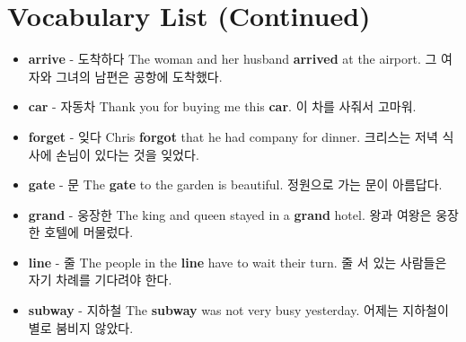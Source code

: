 \documentclass{article}
\begin{document}
\section*{Vocabulary List (Continued)}
\begin{addmargin}[1em]{1em}
    \begin{itemize}
        \item \fontsize{12pt}{14pt}\selectfont \textbf{arrive} - 도착하다 \newline
        The woman and her husband \textbf{arrived} at the airport. \newline
        그 여자와 그녀의 남편은 공항에 도착했다.

        \item \fontsize{12pt}{14pt}\selectfont \textbf{car} - 자동차 \newline
        Thank you for buying me this \textbf{car}. \newline
        이 차를 사줘서 고마워.

        \item \fontsize{12pt}{14pt}\selectfont \textbf{forget} - 잊다 \newline
        Chris \textbf{forgot} that he had company for dinner. \newline
        크리스는 저녁 식사에 손님이 있다는 것을 잊었다.

        \item \fontsize{12pt}{14pt}\selectfont \textbf{gate} - 문 \newline
        The \textbf{gate} to the garden is beautiful. \newline
        정원으로 가는 문이 아름답다.

        \item \fontsize{12pt}{14pt}\selectfont \textbf{grand} - 웅장한 \newline
        The king and queen stayed in a \textbf{grand} hotel. \newline
        왕과 여왕은 웅장한 호텔에 머물렀다.

        \item \fontsize{12pt}{14pt}\selectfont \textbf{line} - 줄 \newline
        The people in the \textbf{line} have to wait their turn. \newline
        줄 서 있는 사람들은 자기 차례를 기다려야 한다.

        \item \fontsize{12pt}{14pt}\selectfont \textbf{subway} - 지하철 \newline
        The \textbf{subway} was not very busy yesterday. \newline
        어제는 지하철이 별로 붐비지 않았다.


\end{itemize}
\end{addmargin}
\end{document}
